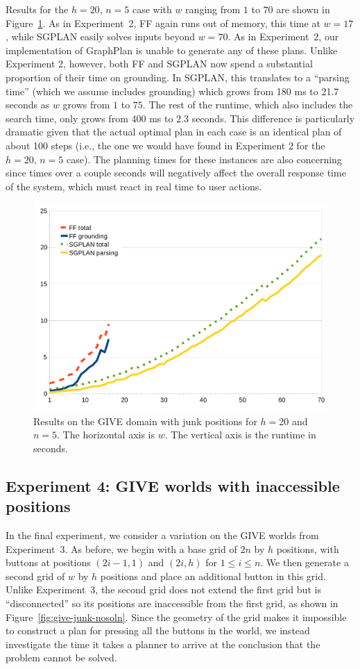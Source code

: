 Results for the $h=20$, $n=5$ case with $w$ ranging from $1$ to $70$ are
shown in Figure~\ref{fig:give-runtime-junk}. As in Experiment~2, FF again
runs out of memory, this time at $w=17$, while SGPLAN easily solves inputs
beyond $w=70$. As in Experiment~2, our implementation of GraphPlan is
unable to generate any of these plans. Unlike Experiment 2, however, both
FF and SGPLAN now spend a substantial proportion of their time on
grounding. In SGPLAN, this translates to a ``parsing time'' (which we
assume includes grounding) which grows from 180 ms to 21.7 seconds as $w$
grows from $1$ to $75$. The rest of the runtime, which also includes the
search time, only grows from 400 ms to 2.3 seconds. This difference is
particularly dramatic given that the actual optimal plan in each case is an
identical plan of about 100 steps (i.e., the one we would have found in
Experiment 2 for the $h=20$, $n=5$ case). The planning times for these
instances are also concerning since times over a couple seconds will
negatively affect the overall response time of the system, which must react
in real time to user actions.

\begin{figure}[t]
  \centering
  \includegraphics[width=0.75\columnwidth]{graph-exp3}
  \caption{Results on the GIVE domain with junk
    positions for $h=20$ and $n=5$. The horizontal axis is $w$.
    The vertical axis is the runtime in seconds.}
  \label{fig:give-runtime-junk}
\end{figure}


\subsection{Experiment 4: GIVE worlds with inaccessible positions}
\label{sec:experiment-4:-give}

In the final experiment, we consider a variation on the GIVE worlds from
Experiment~3. As before, we begin with a base grid of $2n$ by $h$
positions, with buttons at positions $(2i-1,1)$ and $(2i,h)$ for $1 \leq i
\leq n$. We then generate a second grid of $w$ by $h$ positions and place
an additional button in this grid. Unlike Experiment~3, the second grid
does not extend the first grid but is ``disconnected'' so its positions are
inaccessible from the first grid, as shown in
Figure~\ref{fig:give-junk-nosoln}. Since the geometry of the grid makes it
impossible to construct a plan for pressing all the buttons in the world,
we instead investigate the time it takes a planner to arrive at the
conclusion that the problem cannot be solved.

